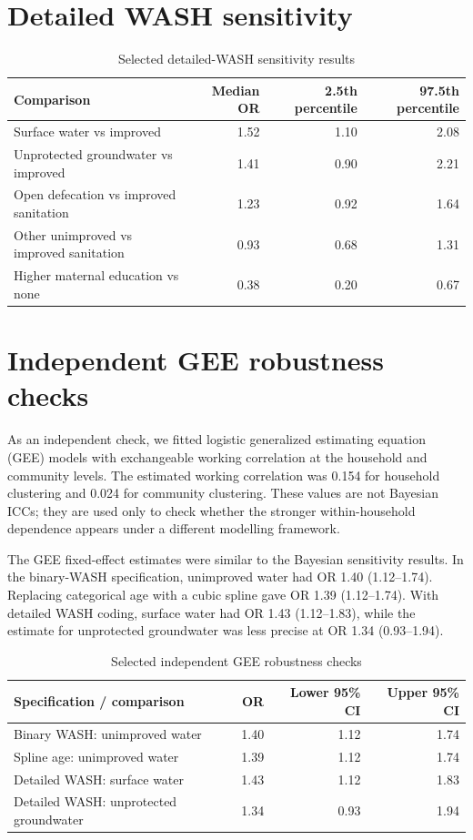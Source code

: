 \documentclass[10pt]{article}
\begin{document}
\section{Detailed WASH sensitivity}

\begin{table}[H]
\centering
\caption{Selected detailed-WASH sensitivity results}
\begin{tabular}{lrrr}
\toprule
Comparison & Median OR & 2.5th percentile & 97.5th percentile \\
\midrule
Surface water vs improved & 1.52 & 1.10 & 2.08 \\
Unprotected groundwater vs improved & 1.41 & 0.90 & 2.21 \\
Open defecation vs improved sanitation & 1.23 & 0.92 & 1.64 \\
Other unimproved vs improved sanitation & 0.93 & 0.68 & 1.31 \\
Higher maternal education vs none & 0.38 & 0.20 & 0.67 \\
\bottomrule
\end{tabular}
\end{table}

\section{Independent GEE robustness checks}

As an independent check, we fitted logistic generalized estimating equation (GEE) models with exchangeable working correlation at the household and community levels. The estimated working correlation was 0.154 for household clustering and 0.024 for community clustering. These values are not Bayesian ICCs; they are used only to check whether the stronger within-household dependence appears under a different modelling framework.

The GEE fixed-effect estimates were similar to the Bayesian sensitivity results. In the binary-WASH specification, unimproved water had OR 1.40 (1.12--1.74). Replacing categorical age with a cubic spline gave OR 1.39 (1.12--1.74). With detailed WASH coding, surface water had OR 1.43 (1.12--1.83), while the estimate for unprotected groundwater was less precise at OR 1.34 (0.93--1.94).

\begin{table}[H]
\centering
\caption{Selected independent GEE robustness checks}
\label{tab:gee_checks}
\begin{tabular}{lrrr}
\toprule
Specification / comparison & OR & Lower 95\% CI & Upper 95\% CI \\
\midrule
Binary WASH: unimproved water & 1.40 & 1.12 & 1.74 \\
Spline age: unimproved water & 1.39 & 1.12 & 1.74 \\
Detailed WASH: surface water & 1.43 & 1.12 & 1.83 \\
Detailed WASH: unprotected groundwater & 1.34 & 0.93 & 1.94 \\
\bottomrule
\end{tabular}
\end{table}
\end{document}
